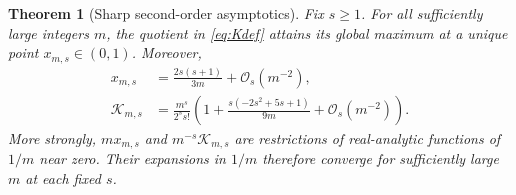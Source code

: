 \documentclass[11pt,a4paper]{article}
\newtheorem{theorem}{Theorem}[section]
\theoremstyle{definition}
\newcommand{\bigO}{\mathcal O}
\newcommand{\Kopt}{\mathcal K}
\begin{document}
\begin{theorem}[Sharp second-order asymptotics]\label{thm:optimalsecond}
Fix $s\ge1$. For all sufficiently large integers $m$, the quotient in
\eqref{eq:Kdef} attains its global maximum at a unique point
$x_{m,s}\in(0,1)$. Moreover,
\begin{align}
 x_{m,s}&=\frac{2s(s+1)}{3m}+\bigO_s(m^{-2}),\label{eq:xmax}\\
 \Kopt_{m,s}&=\frac{m^s}{2^s s!}
 \left(1+\frac{s(-2s^2+5s+1)}{9m}
            +\bigO_s(m^{-2})\right).\label{eq:Ksecond}
\end{align}
More strongly, $m x_{m,s}$ and $m^{-s}\Kopt_{m,s}$ are restrictions of
real-analytic functions of $1/m$ near zero. Their expansions in $1/m$
therefore converge for sufficiently large $m$ at each fixed $s$.
\end{theorem}
\end{document}
